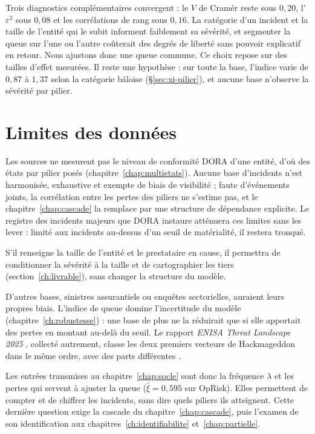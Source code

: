 Trois diagnostics complémentaires convergent : le $V$ de Cramér reste sous $0{,}20$, l'$\varepsilon^2$ sous
$0{,}08$ et les corrélations de rang sous $0{,}16$. La catégorie d'un incident et la taille de l'entité
qui le subit informent faiblement sa sévérité, et segmenter la queue sur l'une ou l'autre coûterait des
degrés de liberté sans pouvoir explicatif en retour. Nous ajustons donc une queue commune. Ce choix repose
sur des tailles d'effet mesurées. Il reste une hypothèse : sur toute la base, l'indice varie de $0{,}87$ à $1{,}37$ selon la catégorie bâloise (\S\ref{sec:xi-pilier}), et aucune
base n'observe la sévérité par pilier.


\section{Limites des données}
\label{sec:portee-donnees}

Les sources ne mesurent pas le niveau de conformité DORA d'une entité, d'où des états par pilier
posés (chapitre~\ref{chap:multietats}). Aucune base d'incidents n'est harmonisée, exhaustive et
exempte de biais de visibilité ; faute d'événements joints, la corrélation entre les pertes des
piliers ne s'estime pas, et le chapitre~\ref{chap:cascade} la remplace par une structure de
dépendance explicite. Le registre des incidents majeurs que DORA instaure atténuera ces limites sans les lever : limité aux incidents au-dessus d'un seuil de matérialité, il restera tronqué.

S'il renseigne la taille de l'entité et le prestataire en cause, il permettra de conditionner la sévérité à la taille et de cartographier les tiers (section~\ref{ch:livrable}), sans changer la structure du modèle.

D'autres bases, sinistres assurantiels ou enquêtes sectorielles, auraient leurs propres biais. L'indice
de queue domine l'incertitude du modèle (chapitre~\ref{ch:robustesse}) : une base de plus ne la
réduirait que si elle apportait des pertes en montant au-delà du seuil. Le rapport \emph{ENISA Threat Landscape 2025} \citep{enisa2025}, collecté autrement, classe les deux premiers
vecteurs de Hackmageddon dans le même ordre, avec des parts différentes \matcomp.

Les entrées transmises au chapitre~\ref{chap:socle} sont donc la fréquence $\lambda$ et les pertes
qui servent à ajuster la queue ($\hat\xi=0{,}595$ sur OpRisk). Elles permettent de compter et de
chiffrer les incidents, sans dire quels piliers ils atteignent. Cette dernière question exige la
cascade du chapitre~\ref{chap:cascade}, puis l'examen de son identification aux
chapitres~\ref{ch:identifiabilite} et~\ref{chap:partielle}.

